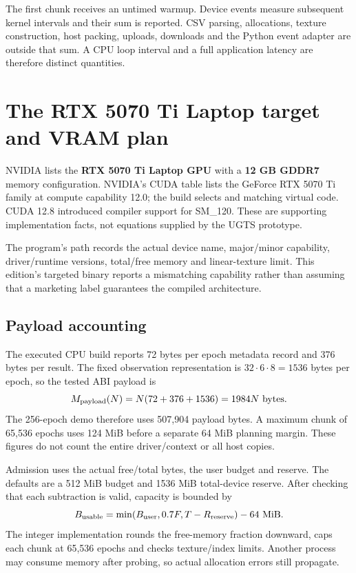 The first chunk receives an untimed warmup. Device events measure subsequent kernel
intervals and their sum is reported. CSV parsing, allocations, texture construction,
host packing, uploads, downloads and the Python event adapter are outside that sum.
A CPU loop interval and a full application latency are therefore distinct quantities.
\clearpage
\section{The RTX 5070 Ti Laptop target and VRAM plan}
NVIDIA lists the \textbf{RTX 5070 Ti Laptop GPU} with a \textbf{12 GB GDDR7} memory
configuration. NVIDIA's CUDA table lists the GeForce RTX 5070 Ti family at compute
capability 12.0; the build selects  and matching virtual code.
CUDA 12.8 introduced compiler support for SM\_120. These are supporting implementation
facts, not equations supplied by the UGTS prototype. 

The program's  path records the actual device name, major/minor
capability, driver/runtime versions, total/free memory and linear-texture limit.
This edition's targeted binary reports a mismatching capability rather than assuming
that a marketing label guarantees the compiled architecture.

\subsection{Payload accounting}
The executed CPU build reports 72 bytes per epoch metadata record and 376 bytes per
result. The fixed observation representation is $32\cdot6\cdot8=1536$ bytes per epoch,
so the tested ABI payload is
\begin{equation}
M_{\rm payload}(N)=N(72+376+1536)=1984N\ \text{bytes}.
\end{equation}
The 256-epoch demo therefore uses 507,904 payload bytes. A maximum chunk of 65,536
epochs uses 124 MiB before a separate 64 MiB planning margin. These figures do not
count the entire driver/context or all host copies.

Admission uses the actual free/total bytes, the user budget and reserve. The defaults
are a 512 MiB budget and 1536 MiB total-device reserve. After checking that each
subtraction is valid, capacity is bounded by
\begin{equation}
B_{\rm usable}=\min(B_{\rm user},0.7F,T-R_{\rm reserve})-64\ \mathrm{MiB}.
\end{equation}
The integer implementation rounds the free-memory fraction downward, caps each chunk
at 65,536 epochs and checks texture/index limits. Another process may consume memory
after probing, so actual allocation errors still propagate.

